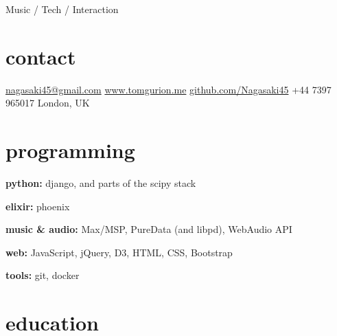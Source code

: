 \documentclass[]{friggeri-cv}  %
\begin{document}
       {Music / Tech / Interaction}


\begin{aside}

\section{contact}

\href{mailto:nagasaki45@gmail.com}{nagasaki45@gmail.com}
\href{http://www.tomgurion.me}{www.tomgurion.me}
\href{https://github.com/Nagasaki45}{github.com/Nagasaki45}
+44 7397 965017
London, UK

\section{programming}

\textbf{python:} django, and parts of the scipy stack

\textbf{elixir:} phoenix

\textbf{music \& audio:} Max/MSP, PureData (and libpd), WebAudio API

\textbf{web:} JavaScript, jQuery, D3, HTML, CSS, Bootstrap

\textbf{tools:} git, docker

\end{aside}


\section{education}
\end{document}
